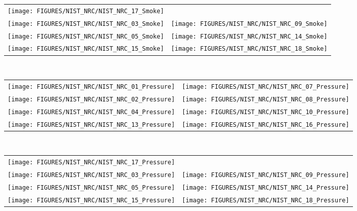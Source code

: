 \begin{figure}[p]
\begin{tabular*}{\textwidth}{l@{\extracolsep{\fill}}r}
\texttt{[image: FIGURES/NIST\_NRC/NIST\_NRC\_17\_Smoke]} & \\
\texttt{[image: FIGURES/NIST\_NRC/NIST\_NRC\_03\_Smoke]} &
\texttt{[image: FIGURES/NIST\_NRC/NIST\_NRC\_09\_Smoke]} \\
\texttt{[image: FIGURES/NIST\_NRC/NIST\_NRC\_05\_Smoke]} &
\texttt{[image: FIGURES/NIST\_NRC/NIST\_NRC\_14\_Smoke]} \\
\texttt{[image: FIGURES/NIST\_NRC/NIST\_NRC\_15\_Smoke]} &
\texttt{[image: FIGURES/NIST\_NRC/NIST\_NRC\_18\_Smoke]}
\end{tabular*}\
\label{NIST_NRC_Smoke_Open}
\end{figure}

\clearpage

\begin{figure}[p]
\begin{tabular*}{\textwidth}{l@{\extracolsep{\fill}}r}
\texttt{[image: FIGURES/NIST\_NRC/NIST\_NRC\_01\_Pressure]} &
\texttt{[image: FIGURES/NIST\_NRC/NIST\_NRC\_07\_Pressure]} \\
\texttt{[image: FIGURES/NIST\_NRC/NIST\_NRC\_02\_Pressure]} &
\texttt{[image: FIGURES/NIST\_NRC/NIST\_NRC\_08\_Pressure]} \\
\texttt{[image: FIGURES/NIST\_NRC/NIST\_NRC\_04\_Pressure]} &
\texttt{[image: FIGURES/NIST\_NRC/NIST\_NRC\_10\_Pressure]} \\
\texttt{[image: FIGURES/NIST\_NRC/NIST\_NRC\_13\_Pressure]} &
\texttt{[image: FIGURES/NIST\_NRC/NIST\_NRC\_16\_Pressure]}
\end{tabular*}\
\label{NIST_NRC_Pressure_Closed}
\end{figure}

\begin{figure}[p]
\begin{tabular*}{\textwidth}{l@{\extracolsep{\fill}}r}
\texttt{[image: FIGURES/NIST\_NRC/NIST\_NRC\_17\_Pressure]} &
   \\
\texttt{[image: FIGURES/NIST\_NRC/NIST\_NRC\_03\_Pressure]} &
\texttt{[image: FIGURES/NIST\_NRC/NIST\_NRC\_09\_Pressure]} \\
\texttt{[image: FIGURES/NIST\_NRC/NIST\_NRC\_05\_Pressure]} &
\texttt{[image: FIGURES/NIST\_NRC/NIST\_NRC\_14\_Pressure]} \\
\texttt{[image: FIGURES/NIST\_NRC/NIST\_NRC\_15\_Pressure]} &
\texttt{[image: FIGURES/NIST\_NRC/NIST\_NRC\_18\_Pressure]}
\end{tabular*}
\label{NIST_NRC_Pressure_Open}
\end{figure}

